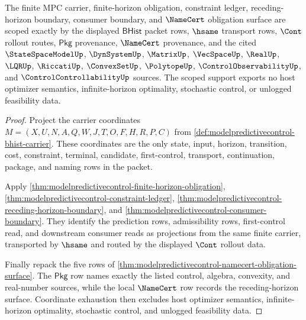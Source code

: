 \begin{theorem}
\label{thm:modelpredictivecontrol-scoped-kernel-support}
The finite MPC carrier, finite-horizon obligation, constraint ledger,
receding-horizon boundary, consumer boundary, and $\NameCert$ obligation
surface are scoped exactly by the displayed $\mathsf{BHist}$ packet rows,
$\hsame$ transport rows, $\Cont$ rollout routes, $\mathsf{Pkg}$ provenance,
$\NameCert$ provenance, and the cited $\StateSpaceModelUp$, $\DynSystemUp$,
$\MatrixUp$, $\VecSpaceUp$, $\RealUp$, $\LQRUp$, $\RiccatiUp$,
$\ConvexSetUp$, $\PolytopeUp$, $\ControlObservabilityUp$, and
$\ControlControllabilityUp$ sources. The scoped support exports no host
optimizer semantics, infinite-horizon optimality, stochastic control, or
unlogged feasibility data.
\end{theorem}
\begin{proof}
Project the carrier coordinates
$M=(X,U,N,A,Q,W,J,T,O,F,H,R,P,C)$ from
\autoref{def:modelpredictivecontrol-bhist-carrier}. These coordinates are the
only state, input, horizon, transition, cost, constraint, terminal, candidate,
first-control, transport, continuation, package, and naming rows in the
packet.

Apply
\autoref{thm:modelpredictivecontrol-finite-horizon-obligation},
\autoref{thm:modelpredictivecontrol-constraint-ledger},
\autoref{thm:modelpredictivecontrol-receding-horizon-boundary}, and
\autoref{thm:modelpredictivecontrol-consumer-boundary}. They identify the
prediction rows, admissibility rows, first-control read, and downstream
consumer reads as projections from the same finite carrier, transported by
$\hsame$ and routed by the displayed $\Cont$ rollout data.

Finally repack the five rows of
\autoref{thm:modelpredictivecontrol-namecert-obligation-surface}. The
$\mathsf{Pkg}$ row names exactly the listed control, algebra, convexity, and
real-number sources, while the local $\NameCert$ row records the
receding-horizon surface. Coordinate exhaustion then excludes host optimizer
semantics, infinite-horizon optimality, stochastic control, and unlogged
feasibility data.
\end{proof}

